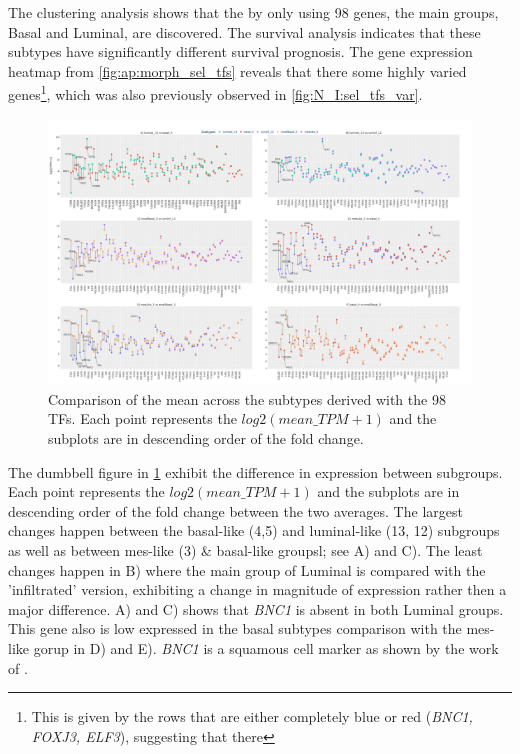 The clustering analysis shows that the by only using 98 genes, the main groups, Basal and Luminal, are discovered. The survival analysis indicates that these subtypes have significantly different survival prognosis. The gene expression heatmap from \cref{fig:ap:morph_sel_tfs} reveals that there some highly varied genes\footnote{This is given by the rows that are either completely blue or red (\textit{BNC1, FOXJ3, ELF3}), suggesting that there }, which was also previously observed in \cref{fig:N_I:sel_tfs_var}. 

\begin{figure}[!ht]   
\centering
\includegraphics[width=1.0\textwidth,height=1.0\textheight,keepaspectratio]{Sections/Network_I/Resources/selective_pruning/dumbell_sel_tfs.png}
  \caption{Comparison of the mean across the subtypes derived with the 98 TFs. Each point represents the $log2(mean\_TPM+1)$ and the subplots are in descending order of the fold change.}
\label{fig:N_I:dumbell_sel_tfs}
\end{figure}


The dumbbell figure in \cref{fig:N_I:dumbell_sel_tfs} exhibit the difference in expression between subgroups. Each point represents the $log2(mean\_TPM+1)$ and the subplots are in descending order of the fold change between the two averages. The largest changes happen between the basal-like (4,5) and luminal-like (13, 12) subgroups as well as between mes-like (3) \& basal-like groupsl; see A) and C). The least changes happen in B) where the main group of Luminal is compared with the 'infiltrated' version, exhibiting a change in magnitude of expression rather then a major difference.   A) and C) shows that \textit{BNC1} is absent in both Luminal groups. This gene also is low expressed in the basal subtypes comparison with the mes-like gorup in D) and E). \textit{BNC1} is a squamous cell marker as shown by the work of \citet{Hurst2022-sp}.

